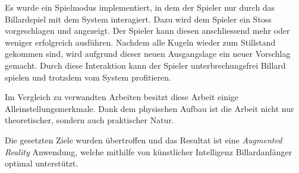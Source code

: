 Es wurde ein Spielmodus implementiert, in dem der Spieler nur durch das Billardspiel mit dem System interagiert.
Dazu wird dem Spieler ein Stoss vorgeschlagen und angezeigt.
Der Spieler kann diesen anschliessend mehr oder weniger erfolgreich ausführen.
Nachdem alle Kugeln wieder zum Stillstand gekommen sind, wird aufgrund dieser neuen Ausgangslage ein neuer Vorschlag gemacht.
Durch diese Interaktion kann der Spieler unterbrechungsfrei Billard spielen und trotzdem vom System profitieren.

Im Vergleich zu verwandten Arbeiten besitzt diese Arbeit einige Alleinstellungsmerkmale.
Dank dem physischen Aufbau ist die Arbeit nicht nur theoretischer, sondern auch praktischer Natur.

Die gesetzten Ziele wurden übertroffen und das Resultat ist eine \emph{Augmented Reality} Anwendung,
welche mithilfe von künstlicher Intelligenz Billardanfänger optimal unterstützt.
